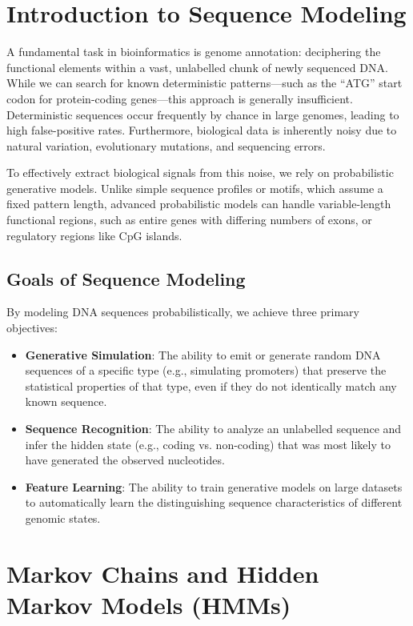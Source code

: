 


\section{Introduction to Sequence Modeling}

A fundamental task in bioinformatics is genome annotation: deciphering the functional elements within a vast, unlabelled chunk of newly sequenced DNA. While we can search for known deterministic patterns—such as the ``ATG'' start codon for protein-coding genes—this approach is generally insufficient. Deterministic sequences occur frequently by chance in large genomes, leading to high false-positive rates. Furthermore, biological data is inherently noisy due to natural variation, evolutionary mutations, and sequencing errors. 

To effectively extract biological signals from this noise, we rely on probabilistic generative models. Unlike simple sequence profiles or motifs, which assume a fixed pattern length, advanced probabilistic models can handle variable-length functional regions, such as entire genes with differing numbers of exons, or regulatory regions like CpG islands. 

\subsection{Goals of Sequence Modeling}
By modeling DNA sequences probabilistically, we achieve three primary objectives:
\begin{itemize}
    \item \textbf{Generative Simulation}: The ability to emit or generate random DNA sequences of a specific type (e.g., simulating promoters) that preserve the statistical properties of that type, even if they do not identically match any known sequence.
    \item \textbf{Sequence Recognition}: The ability to analyze an unlabelled sequence and infer the hidden state (e.g., coding vs. non-coding) that was most likely to have generated the observed nucleotides.
    \item \textbf{Feature Learning}: The ability to train generative models on large datasets to automatically learn the distinguishing sequence characteristics of different genomic states.
\end{itemize}

\section{Markov Chains and Hidden Markov Models (HMMs)}

